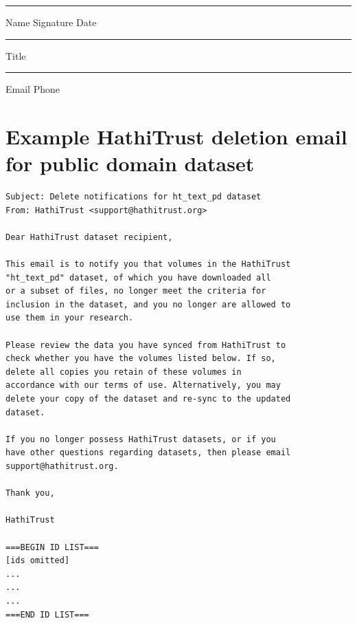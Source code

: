 \documentclass[final]{anthology-ch} %
\begin{document}
\rule{\textwidth}{0.5pt}

Name \hspace{0.3\textwidth} Signature \hspace{0.3\textwidth} Date

\rule{\textwidth}{0.5pt}

Title

\rule{\textwidth}{0.5pt}

Email \hspace{0.3\textwidth}  Phone

\pagebreak 
\section{Example HathiTrust deletion email for public domain dataset} \label{appdx:ht-deletion-email}

\begin{verbatim}
Subject: Delete notifications for ht_text_pd dataset
From: HathiTrust <support@hathitrust.org>

Dear HathiTrust dataset recipient,

This email is to notify you that volumes in the HathiTrust
"ht_text_pd" dataset, of which you have downloaded all
or a subset of files, no longer meet the criteria for
inclusion in the dataset, and you no longer are allowed to
use them in your research.

Please review the data you have synced from HathiTrust to
check whether you have the volumes listed below. If so,
delete all copies you retain of these volumes in
accordance with our terms of use. Alternatively, you may
delete your copy of the dataset and re-sync to the updated
dataset.

If you no longer possess HathiTrust datasets, or if you
have other questions regarding datasets, then please email
support@hathitrust.org.

Thank you,

HathiTrust

===BEGIN ID LIST===
[ids omitted]
...
...
...
===END ID LIST===
\end{verbatim}

\end{document}
